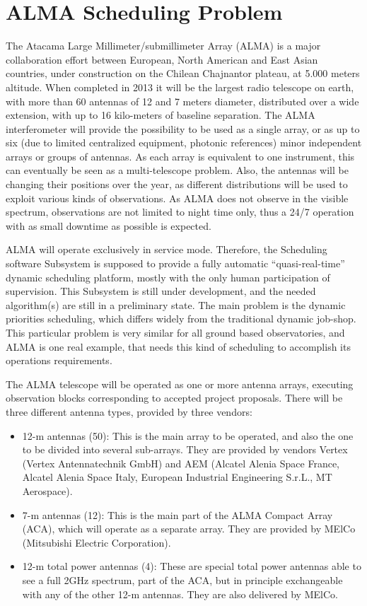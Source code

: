 \section{ALMA Scheduling Problem}
\label{sec:alma-sched-problem}
The Atacama Large Millimeter/submillimeter Array (ALMA) is a major collaboration effort between European, North American and East Asian countries, under construction on the Chilean Chajnantor plateau, at 5.000 meters altitude. When completed in 2013 it will be the largest radio telescope on earth, with more than 60 antennas of 12 and 7 meters diameter, distributed over a wide extension, with up to 16 kilo-meters of baseline separation. The ALMA interferometer will provide the possibility to be used as a single array, or as up to six (due to limited centralized equipment, photonic references) minor independent arrays or groups of antennas. As each array is equivalent to one instrument, this can eventually be seen as a multi-telescope problem. Also, the antennas will be changing their positions over the year, as different distributions will be used to exploit various kinds of observations. As ALMA does not observe in the visible spectrum, observations are not limited to night time only, thus a 24/7 operation with as small downtime as possible is expected. 

ALMA will operate exclusively in service mode. Therefore, the Scheduling software Subsystem is supposed to provide a fully automatic “quasi-real-time” dynamic scheduling platform, mostly with the only human participation of supervision. This Subsystem is still under development, and the needed algorithm(s) are still in a preliminary state. The main problem is the dynamic priorities scheduling, which differs widely from the traditional dynamic job-shop. This particular problem is very similar for all ground based observatories, and ALMA is one real example, that needs this kind of scheduling to accomplish its operations requirements.

The ALMA telescope will be operated as one or more antenna arrays, executing observation blocks corresponding to accepted project proposals. There will be three different antenna types, provided by three vendors:
\begin{itemize}
\item 12-m antennas (50): This is the main array to be operated, and also the one to be divided into several sub-arrays. They are provided by vendors Vertex (Vertex Antennatechnik GmbH) and AEM (Alcatel Alenia Space France, Alcatel Alenia Space Italy, European Industrial Engineering S.r.L., MT Aerospace).

\item 7-m antennas (12): This is the main part of the ALMA Compact Array (ACA), which will  operate as a separate array. They are provided by MElCo (Mitsubishi Electric Corporation).

\item 12-m total power antennas (4): These are special total power antennas able to see a full 2GHz spectrum, part of the ACA, but in principle exchangeable with any of the other 12-m antennas. They are also delivered by MElCo.

\end{itemize}


